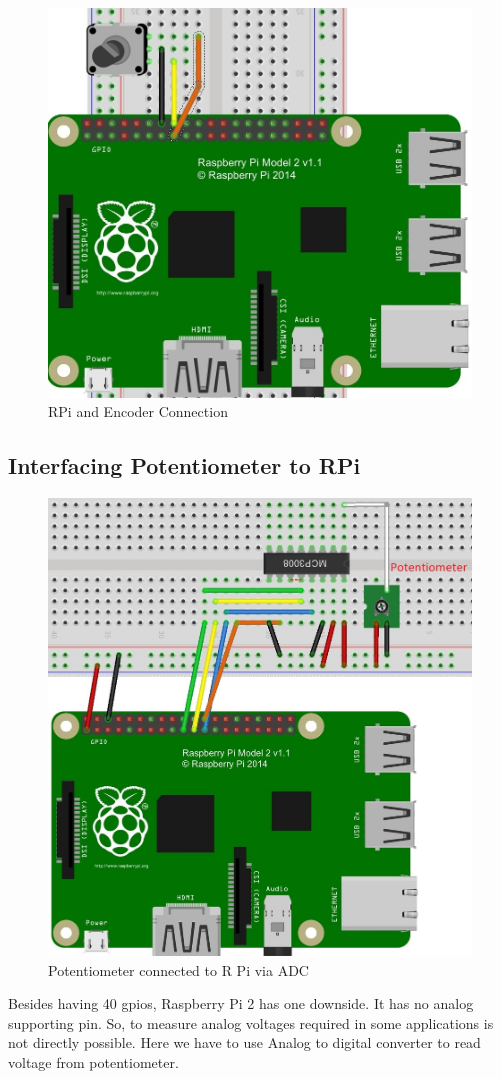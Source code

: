 \documentclass[conference]{IEEEtran}
\begin{document}
\begin{figure}[H]
	\centering
	\includegraphics[width=0.7\linewidth]{rpi_encoder_connection}
	\caption{RPi and Encoder Connection}
	\label{fig:rpi_encoder_connection}
\end{figure}


\subsection{Interfacing Potentiometer to RPi}

\begin{figure}[H]
	\centering
	\includegraphics[width=0.7\linewidth]{rpi_mcp}
	\caption{Potentiometer connected to R Pi via ADC}
	\label{fig:rpi_mcp}
\end{figure}

Besides having 40 gpios, Raspberry Pi 2 has one downside. It has no analog supporting pin.
So, to measure analog voltages required in some applications is not directly possible.
Here we have to use Analog to digital converter to read voltage from potentiometer.
\end{document}
